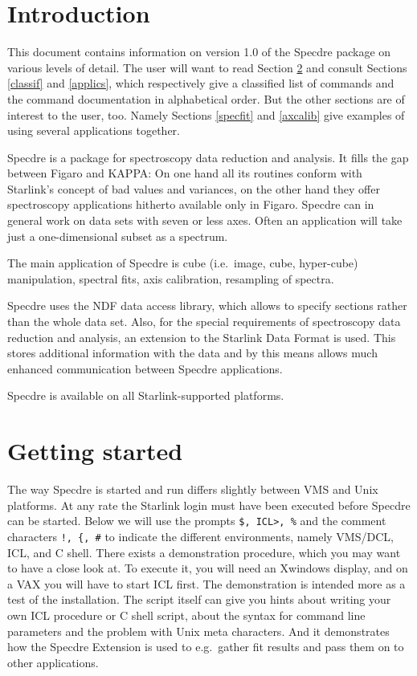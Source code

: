 \newpage

\section{Introduction}
\label{intro}

This document contains information on version 1.0 of the Specdre package
on various levels of detail. The user will want to read Section
\ref{getstart} and consult Sections \ref{classif} and \ref{applics},
which respectively give a classified list of commands and the command
documentation in alphabetical order. But the other sections are of
interest to the user, too.  Namely Sections \ref{specfit} and
\ref{axcalib} give examples of using several applications together.

Specdre is a package for spectroscopy data reduction and analysis. It
fills the gap between Figaro and KAPPA: On one hand all its routines
conform with Starlink's concept of bad values and variances, on the
other hand they offer spectroscopy applications hitherto available only
in Figaro. Specdre can in general work on data sets with seven or less
axes. Often an application will take just a one-dimensional subset as a
spectrum.

The main application of Specdre is cube (i.e.\ image, cube,
hyper-cube) manipulation, spectral fits, axis calibration, resampling of
spectra.

Specdre uses the NDF data access library, which allows to specify
sections rather than the whole data set. Also, for the special
requirements of spectroscopy data reduction and analysis, an extension
to the Starlink Data Format is used. This stores additional information
with the data and by this means allows much enhanced communication
between Specdre applications.

Specdre is available on all Starlink-supported platforms.


\goodbreak
\section{Getting started}
\label{getstart}

The way Specdre is started and run differs slightly between VMS and Unix
platforms. At any rate the Starlink login must have been executed before
Specdre can be started. Below we will use the prompts {\tt \$, ICL>, \%}
and the comment characters {\tt !, \{, \#} to indicate the different
environments, namely VMS/DCL, ICL, and C shell. There exists a
demonstration procedure, which you may want to have a close look at.  To
execute it, you will need an Xwindows display, and on a VAX you will
have to start ICL first.  The demonstration is intended more as a test
of the installation. The script itself can give you hints about writing
your own ICL procedure or C shell script, about the syntax for command
line parameters and the problem with Unix meta characters. And it
demonstrates how the Specdre Extension is used to e.g.\ gather fit
results and pass them on to other applications.

